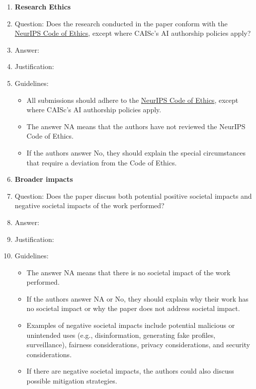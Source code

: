 \documentclass{article}
\begin{document}
\begin{enumerate}
\item {\bf Research Ethics}
    \item[] Question: Does the research conducted in the paper conform with the \href{https://neurips.cc/Conferences/2026/MainTrackHandbook}{NeurIPS Code of Ethics}, except where CAISc's AI authorship policies apply?
    \item[] Answer: \answerTODO{} %
    \item[] Justification: \justificationTODO{}
    \item[] Guidelines:
    \begin{itemize}
        \item All submissions should adhere to the \href{https://neurips.cc/Conferences/2026/MainTrackHandbook}{NeurIPS Code of Ethics}, except where CAISc's AI authorship policies apply.
        \item The answer NA means that the authors have not reviewed the NeurIPS Code of Ethics.
        \item If the authors answer No, they should explain the special circumstances that require a deviation from the Code of Ethics.
    \end{itemize}


\item {\bf Broader impacts}
    \item[] Question: Does the paper discuss both potential positive societal impacts and negative societal impacts of the work performed?
    \item[] Answer: \answerTODO{} %
    \item[] Justification: \justificationTODO{}
    \item[] Guidelines:
    \begin{itemize}
        \item The answer NA means that there is no societal impact of the work performed.
        \item If the authors answer NA or No, they should explain why their work has no societal impact or why the paper does not address societal impact.
        \item Examples of negative societal impacts include potential malicious or unintended uses (e.g., disinformation, generating fake profiles, surveillance), fairness considerations, privacy considerations, and security considerations.
        \item If there are negative societal impacts, the authors could also discuss possible mitigation strategies.
    \end{itemize}


\end{enumerate}
\end{document}
